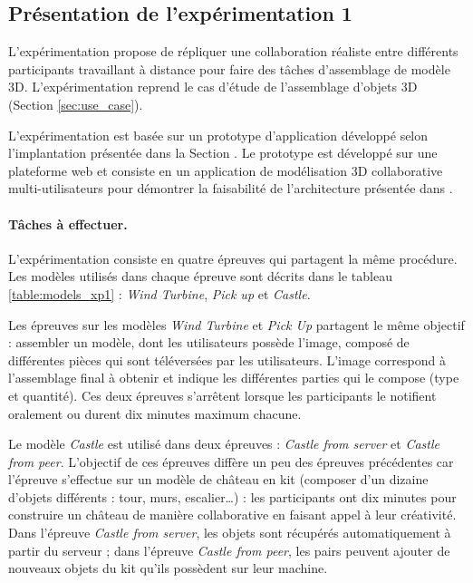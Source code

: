 
\subsection{Présentation de l'expérimentation 1}

L'expérimentation propose de répliquer une collaboration réaliste entre 
différents participants travaillant à distance pour faire des tâches d'assemblage de 
modèle \gls{3D}. L'expérimentation reprend le cas d'étude de l'assemblage d'objets 
\gls{3D} 
(Section \ref{sec:use_case}). 

L'expérimentation est basée sur un prototype d'application développé selon 
l'implantation présentée dans la Section .
Le prototype est développé sur une plateforme web et consiste en un application 
de modélisation \gls{3D} collaborative multi-utilisateurs pour démontrer la 
faisabilité de 
l'architecture présentée dans . 


\paragraph{Tâches à effectuer.}
L'expérimentation consiste en quatre épreuves qui partagent la même procédure.
Les modèles utilisés dans chaque épreuve sont décrits dans le tableau 
\ref{table:models_xp1} : \textit{Wind Turbine}, \textit{Pick up} et \textit{Castle}. 

Les épreuves sur les modèles \textit{Wind Turbine} et \textit{Pick Up} partagent le 
même objectif : 
assembler un modèle, dont les utilisateurs possède l'image, composé de 
différentes pièces qui sont téléversées par les utilisateurs. L'image correspond à 
l'assemblage final à obtenir et indique les différentes parties qui le 
compose (type et quantité). Ces deux épreuves s'arrêtent lorsque les participants 
le notifient oralement ou durent dix minutes maximum chacune.

Le modèle \textit{Castle} est utilisé dans deux épreuves : 
\textit{Castle from server} et \textit{Castle from peer}. L'objectif de ces épreuves
diffère un peu des épreuves précédentes car l'épreuve s'effectue sur un  modèle 
de château en kit (composer d'un dizaine d'objets différents : tour, murs, 
escalier\dots) : les 
participants ont dix minutes pour construire un 
château de manière collaborative en faisant appel à leur créativité. 
Dans l'épreuve \textit{Castle from server}, les objets sont récupérés 
automatiquement à partir du serveur ; 
dans l'épreuve \textit{Castle from peer}, les pairs peuvent ajouter de nouveaux 
objets du kit qu'ils possèdent sur leur machine.

